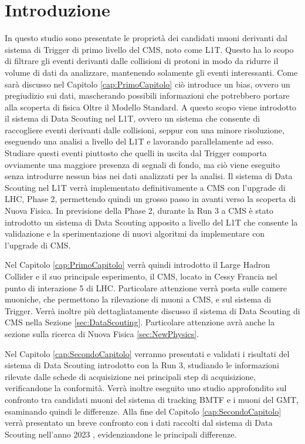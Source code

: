 \chapter{Introduzione}
\label{cap:Introduzione}

In questo studio sono presentate le proprietà dei candidati muoni derivanti dal sistema di Trigger di primo livello del CMS, noto come L1T. Questo ha lo scopo di filtrare gli eventi derivanti dalle collisioni di protoni in modo da ridurre il volume di dati da analizzare, mantenendo solamente gli eventi interessanti. Come sarà discusso nel Capitolo \ref{cap:PrimoCapitolo} ciò introduce un bias, ovvero un pregiudizio sui dati, mascherando possibili informazioni che potrebbero portare alla scoperta di fisica Oltre il Modello Standard. A questo scopo viene introdotto il sistema di Data Scouting nel L1T, ovvero un sistema che consente di raccogliere eventi derivanti dalle collisioni, seppur con una minore risoluzione, eseguendo una analisi a livello del L1T e lavorando parallelamente ad esso. Studiare questi eventi piuttosto che quelli in uscita dal Trigger comporta ovviamente una maggiore presenza di segnali di fondo, ma ciò viene eseguito senza introdurre nessun bias nei dati analizzati per la analisi. Il sistema di Data Scouting nel L1T verrà implementato definitivamente a CMS con l'upgrade di LHC, Phase 2, permettendo quindi un grosso passo in avanti verso la scoperta di Nuova Fisica. In previsione della Phase 2, durante la Run 3 a CMS è stato introdotto un sistema di Data Scouting apposito a livello del L1T che consente la validazione e la sperimentazione di nuovi algoritmi da implementare con l'upgrade di CMS.


Nel Capitolo \ref{cap:PrimoCapitolo} verrà quindi introdotto il Large Hadron Collider e il suo principale esperimento, il CMS, locato in Cessy Francia nel punto di interazione 5 di LHC. Particolare attenzione verrà posta sulle camere muoniche, che permettono la rilevazione di muoni a CMS, e sul sistema di Trigger. Verrà inoltre più dettagliatamente discusso il sistema di Data Scouting di CMS nella Sezione \ref{sec:DataScouting}. Particolare attenzione avrà anche la sezione sulla ricerca di Nuova Fisica \ref{sec:NewPhysics}.

Nel Capitolo \ref{cap:SecondoCapitolo} verranno presentati e validati i risultati del sistema di Data Scouting introdotto con la Run 3, studiando le informazioni rilevate dalle schede di acquisizione nei principali step di acquisizione, verificandone la conformità. Verrà inoltre eseguito uno studio approfondito sul confronto tra candidati muoni del sistema di tracking BMTF e i muoni del GMT, esaminando quindi le differenze. Alla fine del Capitolo \ref{cap:SecondoCapitolo} verrà presentato un breve confronto con i dati raccolti dal sistema di Data Scouting nell'anno 2023 \cite{CERNsummerSchool}, evidenziandone le principali differenze.

